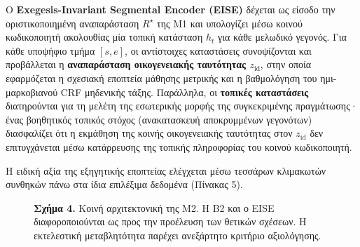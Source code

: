 \documentclass[11pt,a4paper]{article}
\newcommand{\figcap}[2]{\par\vspace{3pt}\begin{minipage}{0.95\linewidth}\footnotesize\textbf{#1} #2\end{minipage}\par}
\begin{document}
Ο \textbf{Exegesis-Invariant Segmental Encoder (EISE)} δέχεται ως είσοδο την οριστικοποιημένη αναπαράσταση \(R^\star\) της Μ1 και υπολογίζει μέσω κοινού κωδικοποιητή ακολουθίας μία τοπική κατάσταση \(h_t\) για κάθε μελωδικό γεγονός. Για κάθε υποψήφιο τμήμα \([s, e]\), οι αντίστοιχες καταστάσεις συνοψίζονται και προβάλλεται η \textbf{αναπαράσταση οικογενειακής ταυτότητας \(z_{\mathrm{id}}\)}, στην οποία εφαρμόζεται η σχεσιακή εποπτεία μάθησης μετρικής και η βαθμολόγηση του ημι-μαρκοβιανού CRF μηδενικής τάξης. Παράλληλα, οι \textbf{τοπικές καταστάσεις} διατηρούνται για τη μελέτη της εσωτερικής μορφής της συγκεκριμένης πραγμάτωσης· ένας βοηθητικός τοπικός στόχος (ανακατασκευή αποκρυμμένων γεγονότων) διασφαλίζει ότι η εκμάθηση της κοινής οικογενειακής ταυτότητας στον \(z_{\mathrm{id}}\) δεν επιτυγχάνεται μέσω κατάρρευσης της τοπικής πληροφορίας του κοινού κωδικοποιητή.

Η ειδική αξία της εξηγητικής εποπτείας ελέγχεται μέσω τεσσάρων κλιμακωτών συνθηκών πάνω στα ίδια επιλέξιμα δεδομένα (Πίνακας 5).

\begin{figure}[htbp]
\centering
{}
\figcap{Σχήμα 4.}{Κοινή αρχιτεκτονική της M2. Η B2 και ο EISE διαφοροποιούνται ως προς την προέλευση των θετικών σχέσεων. Η εκτελεστική μεταβλητότητα παρέχει ανεξάρτητο κριτήριο αξιολόγησης.}
\end{figure}
\end{document}

